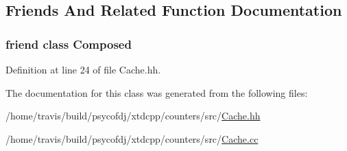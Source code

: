 \subsection{Friends And Related Function Documentation}
\hypertarget{classxtd_1_1counters_1_1Cache_a93e934ad70d5b32b14beed5572450abf}{
\subsubsection[{Composed}]{\setlength{\rightskip}{0pt plus 5cm}friend class {\bf Composed}\hspace{0.3cm}{\ttfamily [friend]}}}\label{classxtd_1_1counters_1_1Cache_a93e934ad70d5b32b14beed5572450abf}


Definition at line 24 of file Cache.\-hh.



The documentation for this class was generated from the following files\-:\begin{DoxyCompactItemize}
\item 
/home/travis/build/psycofdj/xtdcpp/counters/src/\hyperlink{Cache_8hh}{Cache.\-hh}\item 
/home/travis/build/psycofdj/xtdcpp/counters/src/\hyperlink{Cache_8cc}{Cache.\-cc}\end{DoxyCompactItemize}
